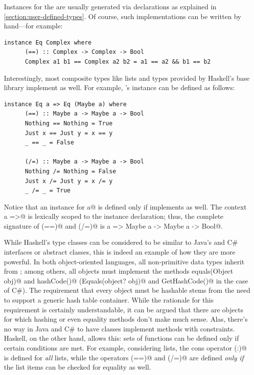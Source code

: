 \documentclass[UdineBachThesis,american,11pt]{PhdThesis}
\begin{document}
  Instances for the \lstinline@Eq@ are usually generated via
  \lstinline@deriving@ declarations as explained in
  \autoref{section:user-defined-types}. Of course, such implementations can be
  written by hand---for example:

  \begin{lstlisting}[gobble=4,basicstyle=\ttfamily\small]
    instance Eq Complex where
      (==) :: Complex -> Complex -> Bool
      Complex a1 b1 == Complex a2 b2 = a1 == a2 && b1 == b2
  \end{lstlisting}

  Interestingly, most composite types like lists and types provided by Haskell's
  base library implement \lstinline@Eq@ as well. For example,
  \lstinline@Maybe@'s instance can be defined as follows:

  \begin{lstlisting}[gobble=4,basicstyle=\ttfamily\small]
    instance Eq a => Eq (Maybe a) where
      (==) :: Maybe a -> Maybe a -> Bool
      Nothing == Nothing = True
      Just x == Just y = x == y
      _ == _ = False

      (/=) :: Maybe a -> Maybe a -> Bool
      Nothing /= Nothing = False
      Just x /= Just y = x /= y
      _ /= _ = True
  \end{lstlisting}

  Notice that an \lstinline@Eq@ instance for \lstinline@Maybe a@ is defined only
  if \lstinline@a@ implements \lstinline@Eq@ as well. The context
  \lstinline@Eq a =>@ is lexically scoped to the instance declaration; thus, the
  complete signature of \lstinline@(==)@ and \lstinline@(/=)@ is
  \lstinline@Eq a => Maybe a -> Maybe a -> Bool@.

  While Haskell's type classes can be considered to be similar to Java's and C\#
  interfaces or abstract classes, this is indeed an example of how they are more
  powerful. In both object-oriented languages, all non-primitive data types
  inherit from \lstinline@Object@; among others, all objects must implement the
  methods \lstinline@boolean equals(Object obj)@ and \lstinline@int hashCode()@
  (\lstinline@bool Equals(object? obj)@ and \lstinline@int GetHashCode()@ in the
  case of C\#). The requirement that every object must be hashable stems from
  the need to support a generic hash table container. While the rationale for
  this requirement is certainly understandable, it can be argued that there are
  objects for which hashing or even equality methods don't make much sense.
  Alas, there's no way in Java and C\# to have classes implement methods with
  constraints. Haskell, on the other hand, allows this: sets of functions can be
  defined only if certain conditions are met. For example, considering lists,
  the cons operator \lstinline@(:)@ is defined for \emph{all} lists, while the
  operators \lstinline@(==)@ and \lstinline@(/=)@ are defined \emph{only if} the
  list items can be checked for equality as well.
\end{document}
